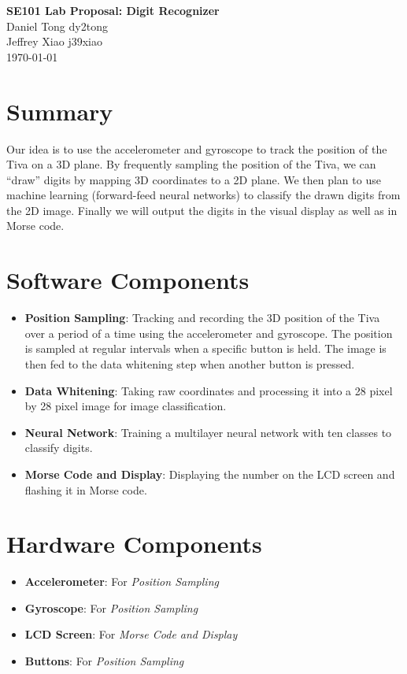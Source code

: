 \documentclass[11pt]{article}
\begin{document}
\begingroup  
  \centering
  \LARGE \textbf{SE101 Lab Proposal: Digit Recognizer}\\\vspace{0.4cm}
  \large Daniel Tong dy2tong\\
  \large Jeffrey Xiao j39xiao\\\vspace{0.2cm}
  \normalsize \today \par
\endgroup

\vspace{0.5cm}
\section*{Summary}
Our idea is to use the accelerometer and gyroscope to track the position of the Tiva on a 3D plane. By frequently sampling the position of the Tiva, we can ``draw'' digits by mapping 3D coordinates to a 2D plane. We then plan to use machine learning (forward-feed neural networks) to classify the drawn digits from the 2D image. Finally we will output the digits in the visual display as well as in Morse code.

\section*{Software Components}
\begin{itemize}
	\item \textbf{Position Sampling}: Tracking and recording the 3D position of the Tiva over a period of a time using the accelerometer and gyroscope. The position is sampled at regular intervals when a specific button is held. The image is then fed to the data whitening step when another button is pressed.
	\item \textbf{Data Whitening}: Taking raw coordinates and processing it into a 28 pixel by 28 pixel image for image classification.
	\item \textbf{Neural Network}: Training a multilayer neural network with ten classes to classify digits.
	\item \textbf{Morse Code and Display}: Displaying the number on the LCD screen and flashing it in Morse code.
\end{itemize}

\section*{Hardware Components}
\begin{itemize}
	\item \textbf{Accelerometer}: For \emph{Position Sampling}
	\item \textbf{Gyroscope}: For \emph{Position Sampling}
	\item \textbf{LCD Screen}: For \emph{Morse Code and Display}
	\item \textbf{Buttons}: For \emph{Position Sampling}
\end{itemize}
\end{document}
